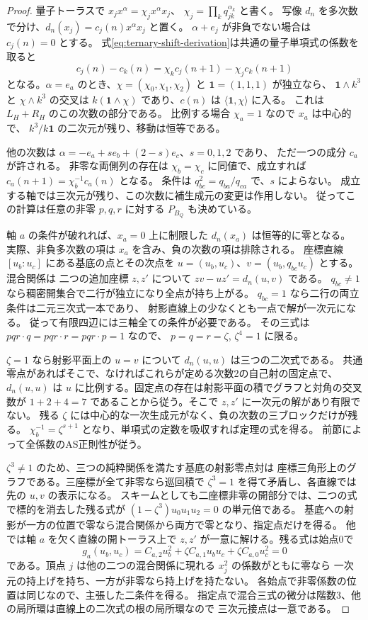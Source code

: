 \begin{proof}
量子トーラスで $x_j x^\alpha=\chi_j x^\alpha x_j$、
$\chi_j=\prod_k q_{jk}^{\alpha_k}$ と書く。
写像 $d_n$ を多次数で分け、$d_n(x_j)=c_j(n)x^\alpha x_j$ と置く。
$\alpha+e_j$ が非負でない場合は $c_j(n)=0$ とする。
式\eqref{eq:ternary-shift-derivation}は共通の量子単項式の係数を取ると
\[
          c_j(n)-c_k(n)=\chi_k c_j(n+1)-\chi_j c_k(n+1)
\]
となる。$\alpha=e_a$ のとき、$\chi=(\chi_0,\chi_1,\chi_2)$ と
$\mathbf1=(1,1,1)$ が独立なら、
$\mathbf1\wedge k^3$ と $\chi\wedge k^3$ の交叉は
$k(\mathbf1\wedge\chi)$ であり、$c(n)$ は $\langle\mathbf1,\chi\rangle$ に入る。
これは $L_H+R_H$ のこの次数の部分である。
比例する場合 $\chi_a=1$ なので $x_a$ は中心的で、
$k^3/k\mathbf1$ の二次元が残り、移動は恒等である。

他の次数は $\alpha=-e_a+s e_b+(2-s)e_c$、$s=0,1,2$ であり、
ただ一つの成分 $c_a$ が許される。
非零な両側列の存在は $\chi_b=\chi_c$ に同値で、成立すれば
$c_a(n+1)=\chi_b^{-1}c_a(n)$ となる。
条件は $q_{bc}^2=q_{ba}/q_{ca}$ で、$s$ によらない。
成立する軸では三次元が残り、この次数に補生成元の変更は作用しない。
従ってこの計算は任意の非零 $p,q,r$ に対する $P_{B_Q}$ も決めている。

軸 $a$ の条件が破れれば、$x_a=0$ 上に制限した $d_n(x_a)$ は恒等的に零となる。
実際、非負多次数の項は $x_a$ を含み、負の次数の項は排除される。
座標直線 $[u_b:u_c]$ にある基底の点とその次点を
$u=(u_b,u_c)$、$v=(u_b,q_{bc}u_c)$ とする。混合関係は
二つの追加座標 $z,z'$ について $zv-uz'=d_n(u,v)$ である。
$q_{bc}\ne1$ なら稠密開集合で二行が独立になり全点が持ち上がる。
$q_{bc}=1$ なら二行の両立条件は二元三次式一本であり、
射影直線上の少なくとも一点で解が一次元になる。
従って有限四辺には三軸全ての条件が必要である。
その三式は $pqr\cdot q=pqr\cdot r=pqr\cdot p=1$ なので、
$p=q=r=\zeta$, $\zeta^4=1$ に限る。

$\zeta=1$ なら射影平面上の $u=v$ について $d_n(u,u)$ は三つの二次式である。
共通零点があればそこで、なければこれらが定める次数2の自己射の固定点で、
$d_n(u,u)$ は $u$ に比例する。固定点の存在は射影平面の積でグラフと対角の交叉数が
$1+2+4=7$ であることから従う。そこで $z,z'$ に一次元の解があり有限でない。
残る $\zeta$ には中心的な一次生成元がなく、負の次数の三ブロックだけが残る。
$\chi_b^{-1}=\zeta^{s+1}$ となり、単項式の定数を吸収すれば定理の式を得る。
前節によって全係数のAS正則性が従う。

$\zeta^3\ne1$ のため、三つの純粋関係を満たす基底の射影零点対は
座標三角形上のグラフである。三座標が全て非零なら巡回積で
$\zeta^3=1$ を得て矛盾し、各直線では先の $u,v$ の表示になる。
スキームとしても二座標非零の開部分では、二つの式で標的を消去した残る式が
$(1-\zeta^3)u_0u_1u_2=0$ の単元倍である。
基底への射影が一方の位置で零なら混合関係から両方で零となり、指定点だけを得る。
他では軸 $a$ を欠く直線の開トーラス上で $z,z'$ が一意に解ける。残る式は始点0で
\[
 g_a(u_b,u_c)=C_{a,2}u_b^2+\zeta C_{a,1}u_bu_c+\zeta C_{a,0}u_c^2=0
\]
である。頂点 $j$ は他の二つの混合関係に現れる $x_j^2$ の係数がともに零なら
一次元の持上げを持ち、一方が非零なら持上げを持たない。
各始点で非零係数の位置は同じなので、主張した二条件を得る。
指定点で混合三式の微分は階数3、他の局所環は直線上の二次式の根の局所環なので
三次元接点は一意である。
\end{proof}

